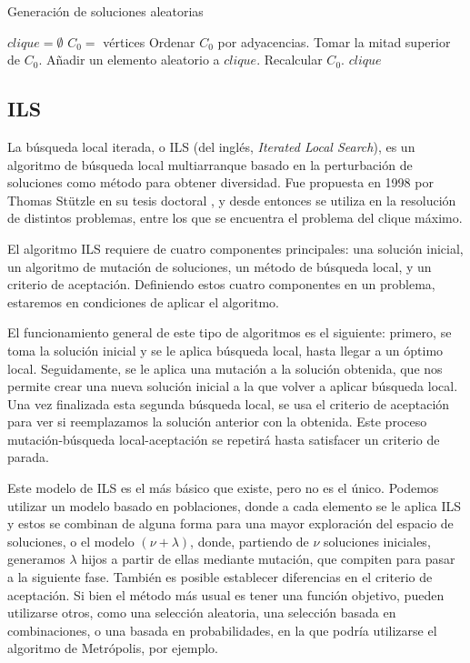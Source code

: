 \begin{algorithm}[H]
\caption{Generación de soluciones aleatorias}
  \begin{algorithmic}
    \State $clique = \emptyset$
    \State $C_0 =$ vértices
    \Repeat
      \State Ordenar $C_0$ por adyacencias.
      \State Tomar la mitad superior de $C_0$.
      \State Añadir un elemento aleatorio a $clique$.
      \State Recalcular $C_0$.
    \Return $clique$
  \end{algorithmic}
\end{algorithm}


\subsection{ILS}\label{ils}

La búsqueda local iterada, o ILS (del inglés, \textit{Iterated Local Search}), es
un algoritmo de búsqueda local multiarranque basado en la perturbación de soluciones
como método para obtener diversidad. Fue propuesta en 1998 por Thomas Stützle en
su tesis doctoral \citep{stuztle:1998}, y desde entonces se utiliza en la resolución
de distintos problemas, entre los que se encuentra el problema del clique máximo.

El algoritmo ILS requiere de cuatro componentes principales: una solución inicial,
un algoritmo de mutación de soluciones, un método de búsqueda local, y un criterio
de aceptación. Definiendo estos cuatro componentes en un problema, estaremos en
condiciones de aplicar el algoritmo.

El funcionamiento general de este tipo de algoritmos es el siguiente: primero, se
toma la solución inicial y se le aplica búsqueda local, hasta llegar a un óptimo local.
Seguidamente, se le aplica una mutación a la solución obtenida, que nos permite crear
una nueva solución inicial a la que volver a aplicar búsqueda local. Una vez finalizada
esta segunda búsqueda local, se usa el criterio de aceptación para ver si reemplazamos
la solución anterior con la obtenida. Este proceso mutación-búsqueda local-aceptación
se repetirá hasta satisfacer un criterio de parada.

Este modelo de ILS es el más básico que existe, pero no es el único. Podemos utilizar
un modelo basado en poblaciones, donde a cada elemento se le aplica ILS y estos se
combinan de alguna forma para una mayor exploración del espacio de soluciones, o el
modelo $(\nu + \lambda)$, donde, partiendo de $\nu$ soluciones iniciales, generamos
$\lambda$ hijos a partir de ellas mediante mutación, que compiten para pasar a la siguiente fase.
También es posible establecer diferencias en el criterio de aceptación. Si bien el
método más usual es tener una función objetivo, pueden utilizarse otros, como una
selección aleatoria, una selección basada en combinaciones, o una basada en probabilidades,
en la que podría utilizarse el algoritmo de Metrópolis, por ejemplo.

